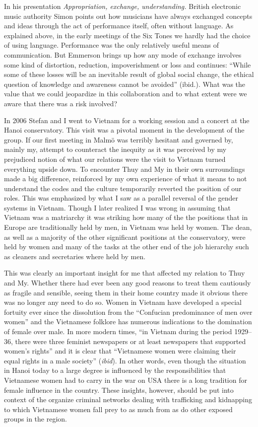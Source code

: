 \documentclass[a4paper]{article}
\begin{document}
In his presentation \emph{Appropriation, exchange, understanding.} British electronic music authority Simon \citep{emmerson06} points out how musicians have always exchanged concepts and ideas through the act of performance itself, often without language. As explained above, in the early meetings of the Six Tones we hardly had the choice of using language. Performance was the only relatively useful means of communication. But Emmerson brings up how any mode of exchange involves some kind of distortion, reduction, impoverishment or loss and continues: ``While some of these losses will be an inevitable result of global social change, the ethical question of knowledge and awareness cannot be avoided'' (ibid.). What was the value that we could jeopardize in this collaboration and to what extent were we aware that there was a risk involved? 

In 2006 Stefan and I went to Vietnam for a working session and a concert at the Hanoi conservatory. This visit was a pivotal moment in the development of the group. If our first meeting in Malmö was terribly hesitant and governed by, mainly my, attempt to counteract the inequity as it was perceived by my prejudiced notion of what our relations were the visit to Vietnam turned everything upside down. To encounter Thuy and My in their own surroundings made a big difference, reinforced by my own experience of what it means to not understand the codes and the culture temporarily reverted the position of our roles. This was emphasized by what I saw as a parallel reversal of the gender systems in Vietnam. Though I later realized I was wrong in assuming that Vietnam was a matriarchy it was striking how many of the the positions that in Europe are traditionally held by men, in Vietnam was held by women. The dean, as well as a majority of the other significant positions at the conservatory, were held by women and many of the tasks at the other end of the job hierarchy such as cleaners and secretaries where held by men.

This was clearly an important insight for me that affected my relation to Thuy and My. Whether there had ever been any good reasons to treat them cautiously as fragile and sensible, seeing them in their home country made it obvious there was no longer any need to do so. Women in Vietnam have developed a special fortuity ever since the dissolution from the ``Confucian predominance of men over women''\citep{VanKy2002} and the Vietnamese folklore has numerous indications to the domination of female over male. In more modern times, ``in Vietnam during the period 1929–36, there were three feminist newspapers or at least newspapers that supported women’s rights'' and it is clear that ``Vietnamese women were claiming their equal rights in a male society'' (\emph{ibid}). In other words, even though the situation in Hanoi today to a large degree is influenced by the responsibilities that Vietnamese women had to carry in the war on USA there is a long tradition for female influence in the country. These insights, however, should be put into context of the organize criminal networks dealing with trafficking and kidnapping to which Vietnamese women fall prey to as much from as do other exposed groups in the region.
\end{document}
